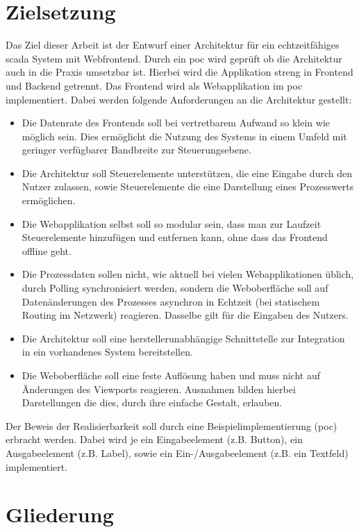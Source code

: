\section{Zielsetzung}
Das Ziel dieser Arbeit ist der Entwurf einer Architektur für ein
echtzeitfähiges \ac{scada} System mit Webfrontend.
Durch ein \ac{poc} wird geprüft ob die Architektur auch in die Praxis umsetzbar ist.
Hierbei wird die Applikation streng in Frontend und Backend getrennt. Das Frontend wird als Webapplikation im \ac{poc} implementiert.
Dabei werden folgende Anforderungen an die Architektur gestellt:
\begin{itemize}
    \item   Die Datenrate des Frontends soll bei vertretbarem Aufwand so klein wie möglich sein.
            Dies ermöglicht die Nutzung des Systems in einem Umfeld mit geringer verfügbarer Bandbreite zur Steuerungsebene.
    \item   Die Architektur soll Steuerelemente unterstützen, die eine Eingabe durch den Nutzer zulassen, sowie Steuerelemente die eine Darstellung eines Prozesswerts ermöglichen.
    \item   Die Webapplikation selbst soll so modular sein, dass man zur Laufzeit Steuerelemente hinzufügen und entfernen kann, ohne dass das Frontend offline geht.
    \item   Die Prozessdaten sollen nicht, wie aktuell bei vielen Webapplikationen üblich, durch Polling synchronisiert werden, sondern die Weboberfläche soll auf Datenänderungen des Prozesses asynchron in Echtzeit (bei statischem Routing im Netzwerk) reagieren. Dasselbe gilt für die Eingaben des Nutzers.
    \item   Die Architektur soll eine herstellerunabhängige Schnittstelle zur Integration in ein vorhandenes System bereitstellen.
    \item   Die Weboberfläche soll eine feste Auflösung haben und muss nicht auf Änderungen des Viewports reagieren.
            Ausnahmen bilden hierbei Darstellungen die dies, durch ihre einfache Gestalt, erlauben.
\end{itemize}
Der Beweis der Realisierbarkeit soll durch eine Beispielimplementierung (\ac{poc}) erbracht werden.
Dabei wird je ein Eingabeelement (z.B. Button), ein Ausgabeelement (z.B. Label), sowie ein Ein-/Ausgabeelement (z.B. ein Textfeld) implementiert.

\section{Gliederung}
